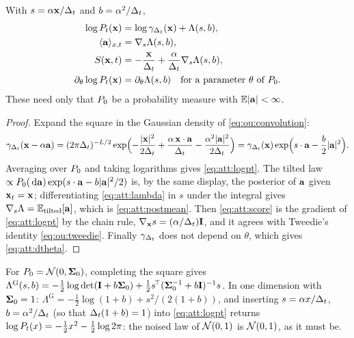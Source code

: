 \begin{proposition}
\label{prop:att:identities}
With $s=\alpha\mathbf{x}/\Delta_t$ and $b=\alpha^2/\Delta_t$,
\begin{align}
  \log P_t(\mathbf{x})&=\log\gamma_{\Delta_t}(\mathbf{x})+\Lambda(s,b),
  \label{eq:att:logpt}\\
  \langle \mathbf{a} \rangle_{x,t}&=\nabla_s\Lambda(s,b),
  \label{eq:att:postmean}\\
  S(\mathbf{x},t)&=-\frac{\mathbf{x}}{\Delta_t}+\frac{\alpha}{\Delta_t}\nabla_s\Lambda(s,b),
  \label{eq:att:score}\\
  \partial_\theta\log P_t(\mathbf{x})&=\partial_\theta\Lambda(s,b)\quad\text{for a parameter $\theta$ of $P_0$.}
  \label{eq:att:dtheta}
\end{align}
These need only that $P_0$ be a probability measure with $\mathbb{E}|\mathbf{a}|<\infty$.
\end{proposition}

\begin{proof}
Expand the square in the Gaussian density of \cref{eq:ou:convolution}:
\[
  \gamma_{\Delta_t}(\mathbf{x}-\alpha\mathbf{a})=(2\pi\Delta_t)^{-L/2}\exp\Bigl(-\frac{|\mathbf{x}|^2}{2\Delta_t}+\frac{\alpha\,\mathbf{x}\cdot\mathbf{a}}{\Delta_t}-\frac{\alpha^2|\mathbf{a}|^2}{2\Delta_t}\Bigr)
  =\gamma_{\Delta_t}(\mathbf{x})\exp\Bigl(s\cdot\mathbf{a}-\frac b2|\mathbf{a}|^2\Bigr).
\]
Averaging over $P_0$ and taking logarithms gives \cref{eq:att:logpt}. The tilted
law $\propto P_0(\,\mathrm{d}\mathbf{a})\exp(s\cdot\mathbf{a}-b|\mathbf{a}|^2/2)$ is, by the same display, the
posterior of $\mathbf{a}$ given $\mathbf{x}_t=\mathbf{x}$; differentiating \cref{eq:att:lambda} in $s$ under
the integral gives $\nabla_s\Lambda=\mathbb{E}_{\text{tilted}}[\mathbf{a}]$, which is
\cref{eq:att:postmean}. Then \cref{eq:att:score} is the gradient of
\cref{eq:att:logpt} by the chain rule, $\nabla_{\mathbf{x}}s=(\alpha/\Delta_t)\mathbf{I}$, and it agrees
with Tweedie's identity \cref{eq:ou:tweedie}. Finally $\gamma_{\Delta_t}$ does not depend
on $\theta$, which gives \cref{eq:att:dtheta}.
\end{proof}

\begin{example}
\label{ex:att:gausslambda}
For $P_0=\mathcal{N}\!\left(0,\mathbf{\Sigma}_0\right)$, completing the square gives
$\Lambda^{\mathrm G}(s,b)=-\tfrac12\log\det(\mathbf{I}+b\mathbf{\Sigma}_0)+\tfrac12s^{\!\top}(\mathbf{\Sigma}_0^{-1}+b\mathbf{I})^{-1}s$.
In one dimension with $\mathbf{\Sigma}_0=1$: $\Lambda^{\mathrm G}=-\tfrac12\log(1+b)+s^2/(2(1+b))$,
and inserting $s=\alpha x/\Delta_t$, $b=\alpha^2/\Delta_t$ (so that $\Delta_t(1+b)=1$) into
\cref{eq:att:logpt} returns $\log P_t(x)=-\tfrac12x^2-\tfrac12\log2\pi$: the noised law
of $\mathcal{N}\!\left(0,1\right)$ is $\mathcal{N}\!\left(0,1\right)$, as it must be.
\end{example}

